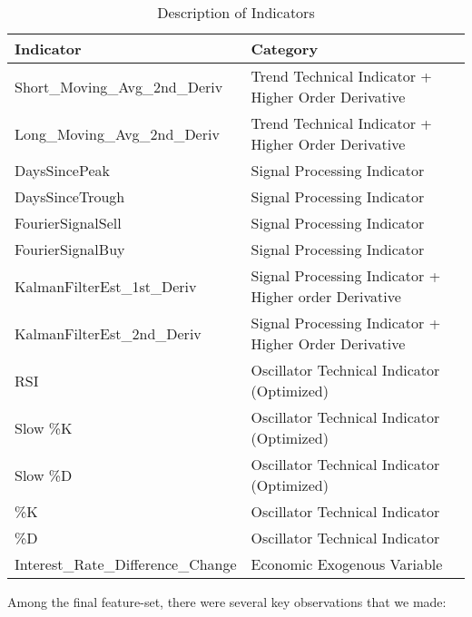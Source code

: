 \documentclass{article}
\begin{document}
\begin{table}[H]
    \centering
    \begin{tabular}{p{} p{}} %
        \hline
        \textbf{Indicator} & \textbf{Category} \\
        \hline
        Short\_Moving\_Avg\_2nd\_Deriv & Trend Technical Indicator + Higher Order Derivative \\
        Long\_Moving\_Avg\_2nd\_Deriv & Trend Technical Indicator + Higher Order Derivative \\
        DaysSincePeak & Signal Processing Indicator \\
        DaysSinceTrough & Signal Processing Indicator \\
        FourierSignalSell & Signal Processing Indicator \\
        FourierSignalBuy & Signal Processing Indicator \\
        KalmanFilterEst\_1st\_Deriv & Signal Processing Indicator + Higher order Derivative \\
        KalmanFilterEst\_2nd\_Deriv & Signal Processing Indicator + Higher Order Derivative\\
        RSI & Oscillator Technical Indicator (Optimized)\\
        Slow \%K & Oscillator Technical Indicator (Optimized)\\
        Slow \%D & Oscillator Technical Indicator (Optimized)\\
        \%K & Oscillator Technical Indicator \\
        \%D & Oscillator Technical Indicator\\
        Interest\_Rate\_Difference\_Change & Economic Exogenous Variable \\
        \hline
    \end{tabular}
    \caption{Description of Indicators}
    \label{tab:indicators}
\end{table}

\newpage
\noindent Among the final feature-set, there were several key observations that we made:
\newline
\end{document}
